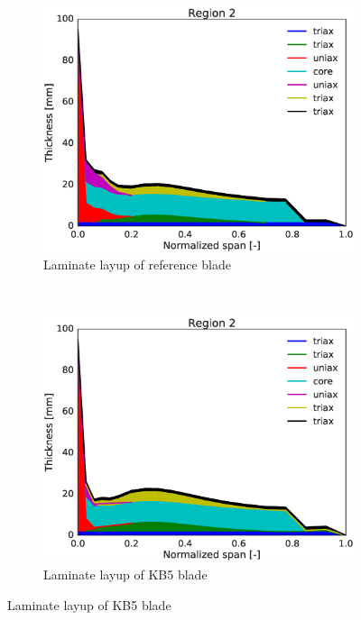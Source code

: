 \begin{figure}[tph]
\begin{subfigure}{0.50\textwidth}
\includegraphics[width=\linewidth]{figures/KB6_final/baseline_laminate_layers_r02.eps}
\caption{Laminate layup of reference blade}
\label{subfig:baseline_layers_r02}
\end{subfigure}
 ~
\begin{subfigure}{0.50\textwidth}
\includegraphics[width=\linewidth]{figures/KB6_final/KB5_laminate_layers_r02.eps}
\caption{Laminate layup of KB5 blade}
\label{subfig:KB5_layers_r02}
\end{subfigure}


\end{figure}
